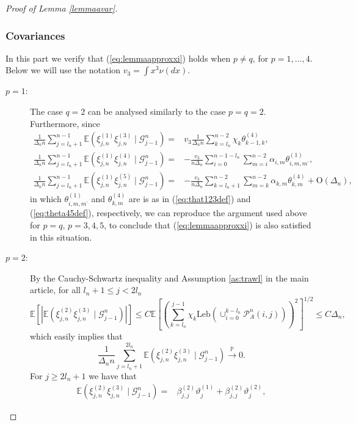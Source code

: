 \documentclass{article}
\theoremstyle{plain}
\theoremstyle{definition}
\theoremstyle{remark}
\newcommand{\Leb}{\ensuremath{\mathrm{Leb}}}
\begin{document}
\begin{appendix}
\begin{proof}[Proof of Lemma \ref{lemmaavar}]
	\subsubsection*{Covariances}
		In this part we verify that (\ref{eq:lemmaapproxxi}) holds when $p\neq q$,
	for $p=1,\ldots,4$. Below we will use the notation $v_{3}=\int x^{3}\nu(dx)$.
	\begin{description}
		\item [{$p=1$:}] The case $q=2$ can be analysed similarly to the case
		$p=q=2$. Furthermore, since
		\begin{align*}
			\frac{1}{\Delta_{n}n}\sum_{j=l_{n}+1}^{n-1}\mathbb{E}(\xi_{j,n}^{(1)}\xi_{j,n}^{(3)}\mid\mathscr{G}_{j-1}^{n})= & v_{3}\frac{1}{\Delta_{n}n}\sum_{k=l_{n}}^{n-2}\chi_{k}\theta_{k-1,k}^{(4)},\\
			\frac{1}{\Delta_{n}n}\sum_{j=l_{n}+1}^{n-1}\mathbb{E}(\xi_{j,n}^{(1)}\xi_{j,n}^{(4)}\mid\mathscr{G}_{j-1}^{n})= & -\frac{v_{3}}{n\Delta_{n}}\sum_{i=0}^{n-1-l_{n}}\sum_{m=i}^{n-2}\alpha_{i,m}\theta_{i,m,m^{\prime}}^{(1)},\\
			\frac{1}{\Delta_{n}n}\sum_{j=l_{n}+1}^{n-1}\mathbb{E}(\xi_{j,n}^{(1)}\xi_{j,n}^{(5)}\mid\mathscr{G}_{j-1}^{n})= & -\frac{v_{3}}{n\Delta_{n}}\sum_{k=l_{n}+1}^{n-2}\sum_{m=k}^{n-2}\alpha_{k,m}\theta_{k,m}^{(4)}+\mathrm{O}(\Delta_n),
		\end{align*}
		in which $\theta_{i,m,m^{\prime}}^{(1)}$ and $\theta_{k,m}^{(4)}$
		are is as in  (\ref{eq:that123def}) and (\ref{eq:theta45def}), respectively,
		we can reproduce the argument used above for $p=q$, $p=3,4,5$, to
		conclude that (\ref{eq:lemmaapproxxi}) is also satisfied in this
		situation. 
		\item [{$p=2$:}] By the Cauchy-Schwartz inequality and Assumption 
		\eqref{as:trawl}
		in the main article, 
		for all $l_{n}+1\leq j<2l_{n}$
		\[
		\mathbb{E}\left[\left|\mathbb{E}(\xi_{j,n}^{(2)}\xi_{j,n}^{(3)}\mid\mathscr{G}_{j-1}^{n})\right|\right]\leq C\mathbb{E}\left[\left(\sum_{k=l_{n}}^{j-1}\chi_{k}\Leb(\cup_{i=0}^{k-l_{n}}\mathcal{P}_{A}^{n}(i,j))\right)^{2}\right]^{1/2}\leq C\Delta_{n},
		\]
		which easily implies that
		\[
		\frac{1}{\Delta_{n}n}\sum_{j=l_{n}+1}^{2l_{n}}\mathbb{E}(\xi_{j,n}^{(2)}\xi_{j,n}^{(3)}\mid\mathscr{G}_{j-1}^{n})\overset{\mathbb{P}}{\rightarrow}0.
		\]
		For $j\geq2l_{n}+1$ we have that 
		\begin{align*}
			\mathbb{E}(\xi_{j,n}^{(2)}\xi_{j,n}^{(3)}\mid\mathscr{G}_{j-1}^{n})= & \beta_{j,j}^{(2)}\vartheta_{j}^{(1)}+\beta_{j,j}^{(2)}\vartheta_{j}^{(2)},
		\end{align*}

\end{description}
\end{proof}
\end{appendix}
\end{document}
